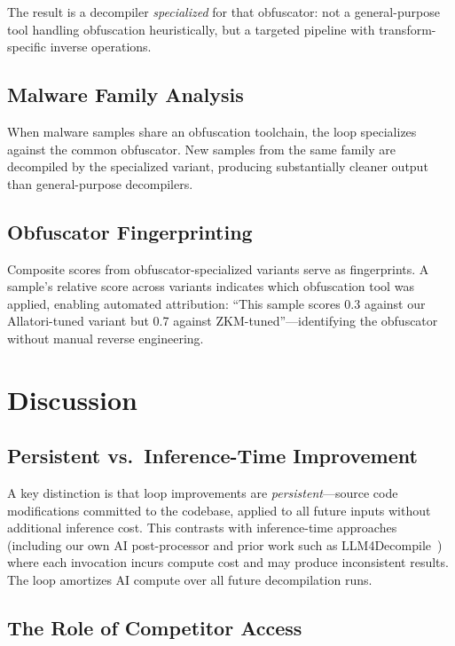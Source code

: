 \documentclass[conference,11pt]{IEEEtran}
\begin{document}
The result is a decompiler \emph{specialized} for that obfuscator: not a general-purpose tool handling obfuscation heuristically, but a targeted pipeline with transform-specific inverse operations.

\subsection{Malware Family Analysis}

When malware samples share an obfuscation toolchain, the loop specializes against the common obfuscator. New samples from the same family are decompiled by the specialized variant, producing substantially cleaner output than general-purpose decompilers.

\subsection{Obfuscator Fingerprinting}

Composite scores from obfuscator-specialized variants serve as fingerprints. A sample's relative score across variants indicates which obfuscation tool was applied, enabling automated attribution: ``This sample scores 0.3 against our Allatori-tuned variant but 0.7 against ZKM-tuned''---identifying the obfuscator without manual reverse engineering.

\section{Discussion}
\label{sec:discussion}

\subsection{Persistent vs.\ Inference-Time Improvement}

A key distinction is that loop improvements are \emph{persistent}---source code modifications committed to the codebase, applied to all future inputs without additional inference cost. This contrasts with inference-time approaches (including our own AI post-processor and prior work such as LLM4Decompile~\cite{llm4decompile}) where each invocation incurs compute cost and may produce inconsistent results. The loop amortizes AI compute over all future decompilation runs.

\subsection{The Role of Competitor Access}
\end{document}

